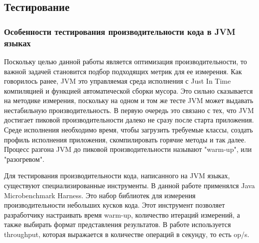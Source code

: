 \subsection{Тестирование} \label{benchmarks}
\subsubsection{Особенности тестирования производительности кода в JVM языках}
Поскольку целью данной работы является оптимизация производительности, то важной задачей становится подбор подходящих метрик для ее измерения.
Как говорилось ранее, JVM это управляемая среда исполнения с Just In Time компиляцией и функцией автоматической сборки мусора. Это сильно сказывается на методике измерения, поскольку на одном и том же тесте JVM может выдавать нестабильную производительность. 
В первую очередь это связано с тех, что JVM достигает пиковой производительности далеко не сразу после старта приложения.
Среде исполнения необходимо время, чтобы загрузить требуемые классы, создать профиль исполнения приложения, скомпилировать горячие методы и так далее.
Процесс разгона JVM до пиковой производительности называют "warm-up", или "разогревом".
\par
Для тестирования производительности кода, написанного на JVM языках, существуют специализированные инструменты. 
В данной работе применялся Java Microbenchmark Harness\cite{jmh}. Это набор библиотек для измерения производительности небольших кусков кода.
Этот инструмент позволяет разработчику настраивать время warm-up, количество итераций измерений, а также выбирать формат представления результатов. 
В работе используется throughput, которая выражается в количестве операций в секунду, то есть op/s. 

